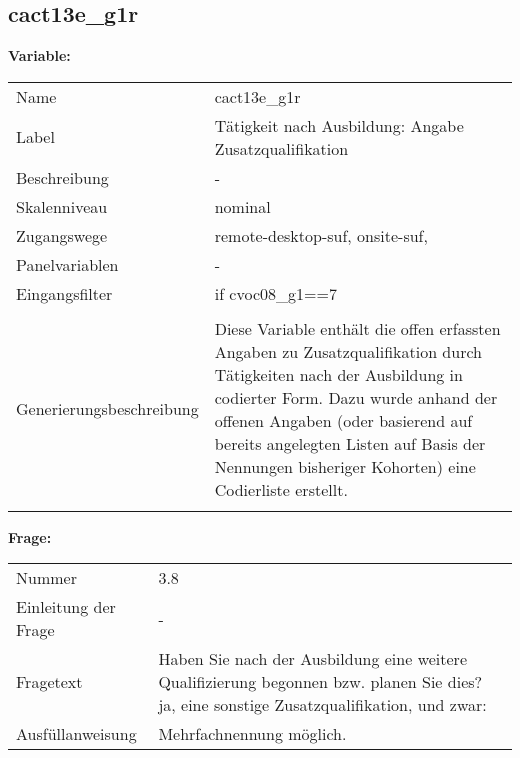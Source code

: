 	
	
	\subsection{cact13e\_g1r}
	\label{subSection:cact13e_g1r}

	\noindent\textbf{Variable:}\\
		\begin{tabular}{lL{11.3cm}}
			\label{tableVariable:cact13e_g1r}
			Name & cact13e\_g1r \\
			Label & Tätigkeit nach Ausbildung: Angabe Zusatzqualifikation \\
			Beschreibung & - \\
			Skalenniveau & nominal \\
			Zugangswege &
				remote-desktop-suf,
				onsite-suf,
 \\
			Panelvariablen & -
			 \\
			Eingangsfilter & if cvoc08\_g1==7 \\
 \\
					Generierungsbeschreibung & Diese Variable enthält die offen erfassten Angaben zu Zusatzqualifikation durch Tätigkeiten nach der Ausbildung in codierter Form. Dazu wurde anhand der offenen Angaben (oder basierend auf bereits angelegten Listen auf Basis der Nennungen bisheriger Kohorten) eine Codierliste erstellt.
				 \\	
			 \\
		\end{tabular}

		\vspace*{1 cm}
		\noindent\textbf{Frage:}\\
		\begin{tabular}{lL{11.3cm}}
			\label{tableQuestion:cact13e_g1r}
			Nummer & 3.8 \\
			Einleitung der Frage & - \\
			Fragetext & Haben Sie nach der Ausbildung eine weitere Qualifizierung begonnen bzw. planen Sie dies?
ja, eine sonstige Zusatzqualifikation, und zwar: \\
			Ausfüllanweisung & Mehrfachnennung möglich. \\
		\end{tabular}





